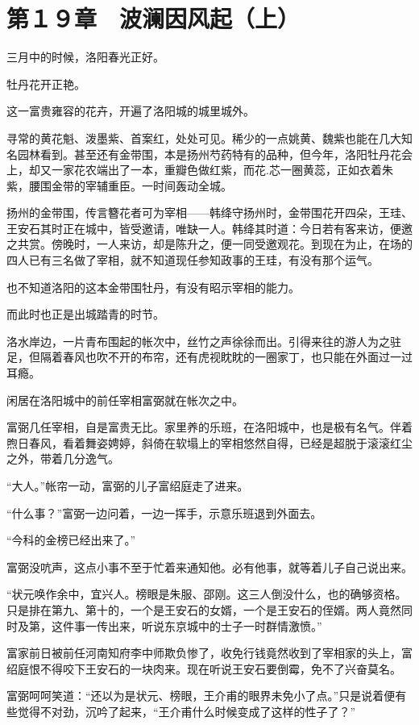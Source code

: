 \section{第１９章　波澜因风起（上）}

三月中的时候，洛阳春光正好。

牡丹花开正艳。

这一富贵雍容的花卉，开遍了洛阳城的城里城外。

寻常的黄花魁、泼墨紫、首案红，处处可见。稀少的一点姚黄、魏紫也能在几大知名园林看到。甚至还有金带围，本是扬州芍药特有的品种，但今年，洛阳牡丹花会上，却又一家花农端出了一本，重瓣色做红紫，而花.芯一圈黄蕊，正如衣着朱紫，腰围金带的宰辅重臣。一时间轰动全城。

扬州的金带围，传言簪花者可为宰相——韩绛守扬州时，金带围花开四朵，王珪、王安石其时正在城中，皆受邀请，唯缺一人。韩绛其时道：今日若有客来访，便邀之共赏。傍晚时，一人来访，却是陈升之，便一同受邀观花。到现在为止，在场的四人已有三名做了宰相，就不知道现任参知政事的王珪，有没有那个运气。

也不知道洛阳的这本金带围牡丹，有没有昭示宰相的能力。

而此时也正是出城踏青的时节。

洛水岸边，一片青布围起的帐次中，丝竹之声徐徐而出。引得来往的游人为之驻足，但隔着春风也吹不开的布帘，还有虎视眈眈的一圈家丁，也只能在外面过一过耳瘾。

闲居在洛阳城中的前任宰相富弼就在帐次之中。

富弼几任宰相，自是富贵无比。家里养的乐班，在洛阳城中，也是极有名气。伴着煦日春风，看着舞姿娉婷，斜倚在软塌上的宰相悠然自得，已经是超脱于滚滚红尘之外，带着几分逸气。

“大人。”帐帘一动，富弼的儿子富绍庭走了进来。

“什么事？”富弼一边问着，一边一挥手，示意乐班退到外面去。

“今科的金榜已经出来了。”

富弼没吭声，这点小事不至于忙着来通知他。必有他事，就等着儿子自己说出来。

“状元唤作余中，宜兴人。榜眼是朱服、邵刚。这三人倒没什么，也的确够资格。只是排在第九、第十的，一个是王安石的女婿，一个是王安石的侄婿。两人竟然同时及第，这件事一传出来，听说东京城中的士子一时群情激愤。”

富家前日被前任河南知府李中师欺负惨了，收免行钱竟然收到了宰相家的头上，富绍庭恨不得咬下王安石的一块肉来。现在听说王安石要倒霉，免不了兴奋莫名。

富弼呵呵笑道：“还以为是状元、榜眼，王介甫的眼界未免小了点。”只是说着便有些觉得不对劲，沉吟了起来，“王介甫什么时候变成了这样的性子了？”

